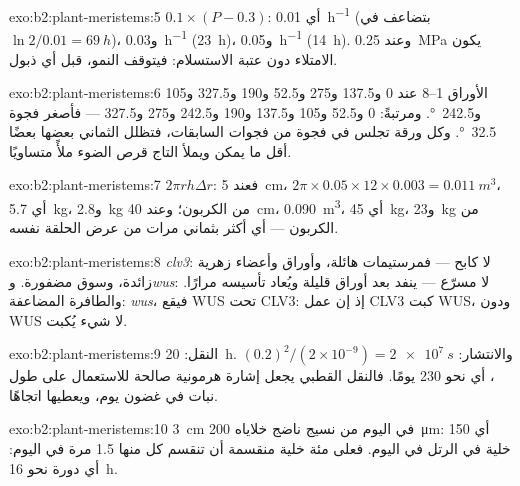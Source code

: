 \begin{solution}{exo:b2:plant-meristems:5}
$0.1\times(P - 0.3)$: أي \qty{0.01}{h^{-1}} (بتضاعف في $\ln 2/0.01 =
\qty{69}{h}$)، و\qty{0.03}{h^{-1}} (\qty{23}{h})، و\qty{0.05}{h^{-1}}
(\qty{14}{h}). وعند \qty{0.25}{MPa} يكون الامتلاء دون عتبة
الاستسلام: فيتوقف النمو، قبل أي ذبول.
\end{solution}

\begin{solution}{exo:b2:plant-meristems:6}
\begingroup\sloppy
الأوراق 1--8 عند 0 و137.5 و275 و52.5 و190 و327.5 و105
و\qty{242.5}{\degree}. ومرتبةً: 0 و52.5 و105 و137.5 و190 و242.5 و275
و327.5 --- فأصغر
فجوة \qty{32.5}{\degree}. وكل ورقة تجلس في فجوة من فجوات السابقات،
فتظلل الثماني بعضها بعضًا أقل ما يمكن ويملأ
التاج قرص الضوء ملأً متساويًا.
\par\endgroup
\end{solution}

\begin{solution}{exo:b2:plant-meristems:7}
$2\pi r h\Delta r$: فعند \qty{5}{cm}، $2\pi\times 0.05\times 12\times
0.003 = \qty{0.011}{m^3}$، أي \qty{5.7}{kg}، و\qty{2.8}{kg} من الكربون؛ وعند
\qty{40}{cm}، \qty{0.090}{m^3}، أي \qty{45}{kg}، و\qty{23}{kg} من الكربون
--- أي أكثر بثماني مرات من عرض الحلقة نفسه.
\end{solution}

\begin{solution}{exo:b2:plant-meristems:8}
\emph{clv3}: لا كابح --- فمرستيمات هائلة، وأوراق وأعضاء زهرية
زائدة، وسوق مضفورة. و\emph{wus}: لا مسرّع --- 
ينفد بعد أوراق قليلة ويُعاد تأسيسه مرارًا. والطافرة
المضاعفة:  \emph{wus}، فيقع WUS تحت CLV3:
إذ إن عمل CLV3 كبت WUS، ودون WUS لا شيء يُكبت.
\end{solution}

\begin{solution}{exo:b2:plant-meristems:9}
النقل: \qty{20}{h}. والانتشار: $(0.2)^{2}/(2\times 10^{-9}) =
\qty{2e7}{s}$، أي نحو 230 يومًا. فالنقل القطبي يجعل إشارة
هرمونية صالحة للاستعمال على طول نبات في غضون يوم، ويعطيها
اتجاهًا.
\end{solution}

\begin{solution}{exo:b2:plant-meristems:10}
\qty{3}{cm} في اليوم من نسيج ناضج خلاياه \qty{200}{\micro m}:
أي \num{150} خلية في الرتل في اليوم. فعلى مئة خلية منقسمة
أن تنقسم كل منها 1.5 مرة في اليوم: أي دورة نحو \qty{16}{h}.
\end{solution}


